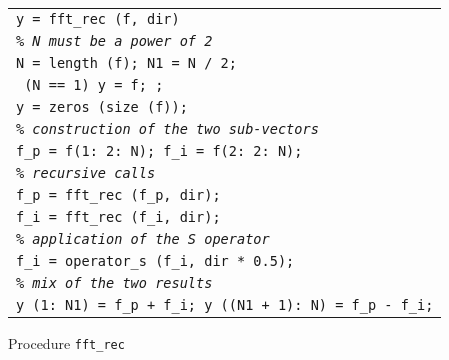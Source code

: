 \begin{listing} \begin{footnotesize}
 
 
\noindent
{\upshape
\begin{tabular}{l} \texttt{\pfunction y = fft\_rec (f, dir)} \\
\texttt{\textit{\% N must be a power of 2}} \\
\texttt{N = length (f); N1 = N / 2;} \\
\texttt{\pif{} (N == 1) y = f; \preturn{} \pend{};} \\
\texttt{y = zeros (size (f));} \\
\texttt{\textit{\% construction of the two sub-vectors}} \\
\texttt{f\_p = f(1: 2: N); f\_i = f(2: 2: N);} \\
\texttt{\textit{\% recursive calls}} \\
\texttt{f\_p = fft\_rec (f\_p, dir);} \\
\texttt{f\_i = fft\_rec (f\_i, dir);} \\
\texttt{\textit{\% application of the S operator}} \\
\texttt{f\_i = operator\_s (f\_i, dir * 0.5);} \\
\texttt{\textit{\% mix of the two results}} \\
\texttt{y (1: N1) = f\_p + f\_i; y ((N1 + 1): N) = f\_p - f\_i;} \\
\end{tabular}
}
 
\noindent \end{footnotesize}
 
\caption{Procedure \texttt{\upshape fft\_rec}}
 
\label{listing-fft-rec}
\end{listing}
 
